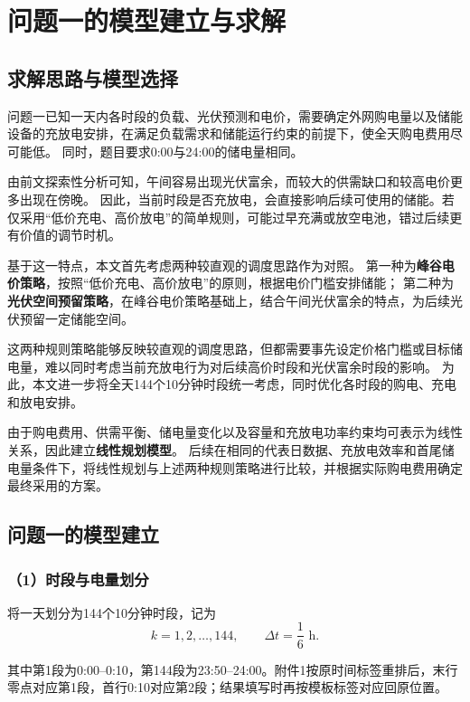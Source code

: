\section{问题一的模型建立与求解}

\subsection{求解思路与模型选择}

问题一已知一天内各时段的负载、光伏预测和电价，需要确定外网购电量以及储能设备的充放电安排，在满足负载需求和储能运行约束的前提下，使全天购电费用尽可能低。
同时，题目要求0:00与24:00的储电量相同。

由前文探索性分析可知，午间容易出现光伏富余，而较大的供需缺口和较高电价更多出现在傍晚。
因此，当前时段是否充放电，会直接影响后续可使用的储能。若仅采用“低价充电、高价放电”的简单规则，可能过早充满或放空电池，错过后续更有价值的调节时机。

基于这一特点，本文首先考虑两种较直观的调度思路作为对照。
第一种为\textbf{峰谷电价策略}，按照“低价充电、高价放电”的原则，根据电价门槛安排储能；
第二种为\textbf{光伏空间预留策略}，在峰谷电价策略基础上，结合午间光伏富余的特点，为后续光伏预留一定储能空间。

这两种规则策略能够反映较直观的调度思路，但都需要事先设定价格门槛或目标储电量，难以同时考虑当前充放电行为对后续高价时段和光伏富余时段的影响。
为此，本文进一步将全天144个10分钟时段统一考虑，同时优化各时段的购电、充电和放电安排。

由于购电费用、供需平衡、储电量变化以及容量和充放电功率约束均可表示为线性关系，因此建立\textbf{线性规划模型}。
后续在相同的代表日数据、充放电效率和首尾储电量条件下，将线性规划与上述两种规则策略进行比较，并根据实际购电费用确定最终采用的方案。

\subsection{问题一的模型建立}

\subsubsection*{（1）时段与电量划分}

将一天划分为144个10分钟时段，记为
\[
k=1,2,\ldots,144,\qquad \Delta t=\frac{1}{6}\text{ h}.
\]

其中第1段为0:00--0:10，第144段为23:50--24:00。附件1按原时间标签重排后，末行零点对应第1段，首行0:10对应第2段；结果填写时再按模板标签对应回原位置。

